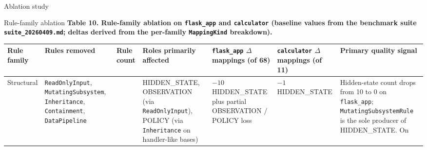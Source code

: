 \documentclass[
  ignorenonframetext,
]{beamer}
\newcounter{none} %
\begin{document}
\begin{frame}[fragile]{Ablation study}
\begin{block}{Rule-family ablation}
\textbf{Table 10. Rule-family ablation on \texttt{flask\_app} and
\texttt{calculator} (baseline values from the benchmark suite
\texttt{suite\_20260409.md}; deltas derived from the per-family
\texttt{MappingKind} breakdown).}

{\def\LTcaptype{none} %
\begin{longtable}[]{@{}
  >{\raggedright\arraybackslash}p{}
  >{\raggedright\arraybackslash}p{}
  >{\raggedleft\arraybackslash}p{}
  >{\raggedright\arraybackslash}p{}
  >{\centering\arraybackslash}p{}
  >{\centering\arraybackslash}p{}
  >{\raggedright\arraybackslash}p{}@{}}
\toprule\noalign{}
\begin{minipage}[b]{\linewidth}\raggedright
Rule family
\end{minipage} & \begin{minipage}[b]{\linewidth}\raggedright
Rules removed
\end{minipage} & \begin{minipage}[b]{\linewidth}\raggedleft
Rule count
\end{minipage} & \begin{minipage}[b]{\linewidth}\raggedright
Roles primarily affected
\end{minipage} & \begin{minipage}[b]{\linewidth}\centering
\texttt{flask\_app} \(\Delta\) mappings (of 68)
\end{minipage} & \begin{minipage}[b]{\linewidth}\centering
\texttt{calculator} \(\Delta\) mappings (of 11)
\end{minipage} & \begin{minipage}[b]{\linewidth}\raggedright
Primary quality signal
\end{minipage} \\
\midrule\noalign{}
\endhead
Structural & \texttt{ReadOnlyInput}, \texttt{MutatingSubsystem},
\texttt{Inheritance}, \texttt{Containment}, \texttt{DataPipeline} & 5 &
HIDDEN\_STATE, OBSERVATION (via \texttt{ReadOnlyInput}), POLICY (via
\texttt{Inheritance} on handler-like bases) & \(-10\) HIDDEN\_STATE plus
partial OBSERVATION / POLICY loss & \(-1\) HIDDEN\_STATE & Hidden-state
count drops from 10 to 0 on \texttt{flask\_app};
\texttt{MutatingSubsystemRule} is the sole producer of HIDDEN\_STATE. On

\end{longtable}}
\end{block}
\end{frame}
\end{document}
